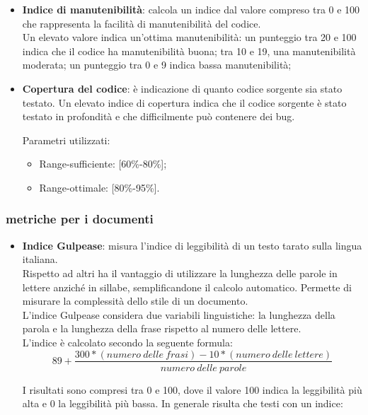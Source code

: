 {{{\begin{itemize}
		\item \textbf{Indice di manutenibilità}: calcola un indice dal valore compreso tra 0 e 100 che rappresenta la facilità di manutenibilità del codice.  \\
		Un elevato valore indica un'ottima manutenibilità: un punteggio tra 20 e 100 indica che il codice ha manutenibilità buona; tra 10 e 19, una manutenibilità moderata; un punteggio tra 0 e 9 indica bassa manutenibilità;
		
		\item \textbf{Copertura del codice}: è indicazione di quanto codice sorgente sia stato testato. Un elevato indice di copertura indica che il codice sorgente è stato testato in profondità e che difficilmente può contenere dei bug.
		
		Parametri utilizzati:
		\begin{itemize}
		\item Range-sufficiente: [60\%-80\%];
		\item Range-ottimale: [80\%-95\%].
		\end{itemize}
	\end{itemize}
	}
\subsubsection{metriche per i documenti}{
	\label{sec:metricadocumenti}
	\begin{itemize}
		\item \textbf{Indice Gulpease}: misura l'indice di leggibilità di un testo tarato sulla lingua italiana.\\
		Rispetto ad altri ha il vantaggio di utilizzare la lunghezza delle parole in lettere anziché in sillabe, semplificandone il calcolo automatico. Permette di misurare la complessità dello stile di un documento.\\
		L'indice Gulpease considera due variabili linguistiche: la lunghezza della parola e la lunghezza della frase rispetto al numero delle lettere.\\
		L'indice è calcolato secondo la seguente formula:\\
		
		\[89 + \frac{300 *(numero\ delle\ frasi) -10 *(numero\ delle\ lettere)}{numero\ delle\ parole}\]
		
		I risultati sono compresi tra 0 e 100, dove il valore 100 indica la leggibilità più alta e 0 la leggibilità più bassa. In generale risulta che testi con un indice:
		

\end{itemize}}}}
